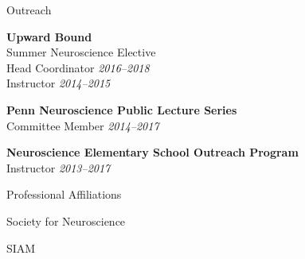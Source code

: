 \documentclass{resume} %
\begin{document}

\begin{rSection}{Outreach}

\textbf{Upward Bound}\\
Summer Neuroscience Elective \\
Head Coordinator \hfill \emph{2016--2018} \\
Instructor \hfill \emph{2014--2015}

\textbf{Penn Neuroscience Public Lecture Series}\\
Committee Member \hfill \emph{2014--2017}

\textbf{Neuroscience Elementary School Outreach Program}\\
Instructor \hfill \emph{2013--2017}

\end{rSection}


\begin{rSection}{Professional Affiliations}

Society for Neuroscience

SIAM

\end{rSection}
\end{document}
